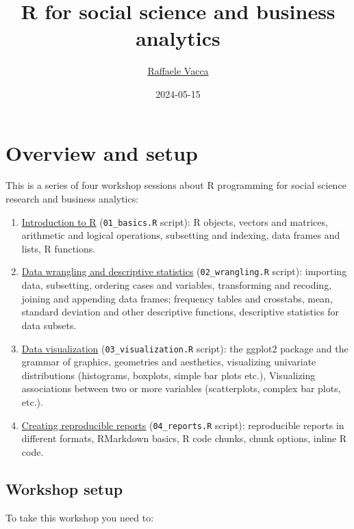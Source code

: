 \documentclass[
]{book}
\title{R for social science and business analytics}
\author{\href{http://www.raffaelevacca.com/}{Raffaele Vacca}}
\date{2024-05-15}
\providecommand{\tightlist}{%
  \setlength{\itemsep}{0pt}\setlength{\parskip}{0pt}}
\begin{document}
\maketitle

{
\setcounter{tocdepth}{1}
\tableofcontents
}
\hypertarget{overview-and-setup}{%
\chapter{Overview and setup}\label{overview-and-setup}}

This is a series of four workshop sessions about R programming for social science research and business analytics:

\begin{enumerate}
\def\labelenumi{\arabic{enumi}.}
\tightlist
\item
  \protect\hyperlink{intro}{Introduction to R} (\texttt{01\_basics.R} script): R objects, vectors and matrices, arithmetic and logical operations, subsetting and indexing, data frames and lists, R functions.
\item
  \protect\hyperlink{wrangling}{Data wrangling and descriptive statistics} (\texttt{02\_wrangling.R} script): importing data, subsetting, ordering cases and variables, transforming and recoding, joining and appending data frames; frequency tables and crosstabs, mean, standard deviation and other descriptive functions, descriptive statistics for data subsets.
\item
  \protect\hyperlink{visualization}{Data visualization} (\texttt{03\_visualization.R} script): the ggplot2 package and the grammar of graphics, geometries and aesthetics, visualizing univariate distributions (histograms, boxplots, simple bar plots etc.), Visualizing associations between two or more variables (scatterplots, complex bar plots, etc.).
\item
  \protect\hyperlink{reproducible}{Creating reproducible reports} (\texttt{04\_reports.R} script): reproducible reports in different formats, RMarkdown basics, R code chunks, chunk options, inline R code.
\end{enumerate}

\hypertarget{setup}{%
\section{Workshop setup}\label{setup}}

To take this workshop you need to:
\end{document}
